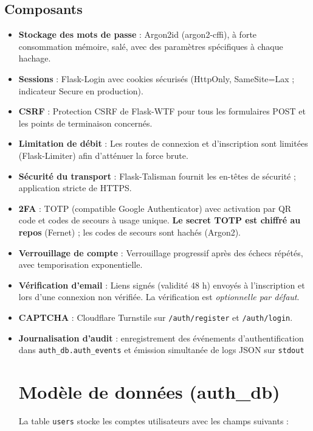 \subsection{Composants}
\begin{itemize}
  \item \textbf{Stockage des mots de passe} : Argon2id (argon2-cffi), à forte consommation mémoire, salé, avec des paramètres spécifiques à chaque hachage.
  \item \textbf{Sessions} : Flask-Login avec cookies sécurisés (HttpOnly, SameSite=Lax ; indicateur Secure en production).
  \item \textbf{CSRF} : Protection CSRF de Flask-WTF pour tous les formulaires POST et les points de terminaison concernés.
  \item \textbf{Limitation de débit} : Les routes de connexion et d'inscription sont limitées (Flask-Limiter) afin d'atténuer la force brute.
  \item \textbf{Sécurité du transport} : Flask-Talisman fournit les en-têtes de sécurité ; application stricte de HTTPS.
  \item \textbf{2FA} : TOTP (compatible Google Authenticator) avec activation par QR code et codes de secours à usage unique. \textbf{Le secret TOTP est chiffré au repos} (Fernet) ; les codes de secours sont hachés (Argon2).
  \item \textbf{Verrouillage de compte} : Verrouillage progressif après des échecs répétés, avec temporisation exponentielle.
  \item \textbf{Vérification d'email} : Liens signés (validité 48 h) envoyés à l'inscription et lors d'une connexion non vérifiée. La vérification est \emph{optionnelle par défaut}.
  \item \textbf{CAPTCHA} : Cloudflare Turnstile sur \texttt{/auth/register} et \texttt{/auth/login}.
  \item \textbf{Journalisation d'audit} : enregistrement des événements d'authentification dans \texttt{auth\_db.auth\_events} et émission simultanée de logs JSON sur \texttt{stdout}

\section{Modèle de données (auth\_db)}
La table \texttt{users} stocke les comptes utilisateurs avec les champs suivants :


\end{itemize}
